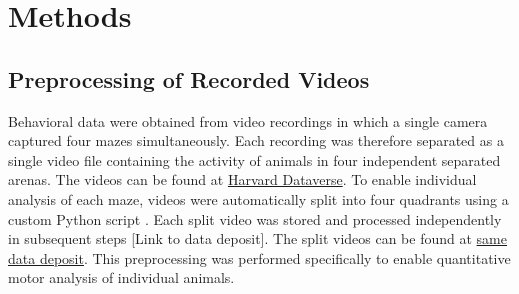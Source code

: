 \section{Methods}

\subsection{Preprocessing of Recorded Videos}
Behavioral data were obtained from video recordings in which a single camera captured four mazes simultaneously. Each recording was therefore separated as a single video file containing the activity of animals in four independent separated arenas. The videos can be found at \href{https://doi.org/10.7910/DVN/WHH7W2}{Harvard Dataverse}. To enable individual analysis of each maze, videos were automatically split into four quadrants using a custom Python script \href{https://github.com/atanugiri/GhrelinBehaviorQuantification/blob/main/Python_scripts/Utility_functions/split_videos_by_quadrants.py}{}.
Each split video was stored and processed independently in subsequent steps [Link to data deposit]. The split videos can be found at \href{https://doi.org/10.7910/DVN/WHH7W2}{same data deposit}. This preprocessing was performed specifically to enable quantitative motor analysis of individual animals.
